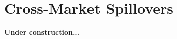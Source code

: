\documentclass[9pt,aspectratio=169]{beamer}
\begin{document}
\section{Cross-Market Spillovers}






\begin{frame}
      \begin{center}
            \textbf{Under construction...}
      \end{center}
\end{frame}
\end{document}
